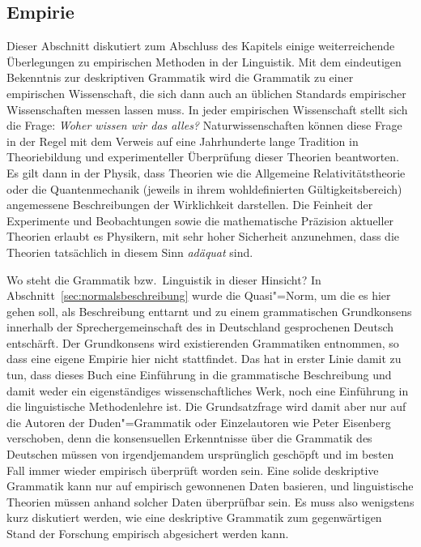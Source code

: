 \subsection{Empirie}
\label{sec:empirie}


Dieser Abschnitt diskutiert zum Abschluss des Kapitels einige weiterreichende Überlegungen zu empirischen Methoden in der Linguistik.
Mit dem eindeutigen Bekenntnis zur deskriptiven Grammatik wird die Grammatik zu einer empirischen Wissenschaft, die sich dann auch an üblichen Standards empirischer Wissenschaften messen lassen muss.
In jeder empirischen Wissenschaft stellt sich die Frage:
\textit{Woher wissen wir das alles?}
Naturwissenschaften können diese Frage in der Regel mit dem Verweis auf eine Jahrhunderte lange Tradition in Theoriebildung und experimenteller Überprüfung dieser Theorien beantworten.
Es gilt dann \zB in der Physik, dass Theorien wie die Allgemeine Relativitätstheorie oder die Quantenmechanik (jeweils in ihrem wohldefinierten Gültigkeitsbereich) angemessene Beschreibungen der Wirklichkeit darstellen.
Die Feinheit der Experimente und Beobachtungen sowie die mathematische Präzision aktueller Theorien erlaubt es Physikern, mit sehr hoher Sicherheit anzunehmen, dass die Theorien tatsächlich in diesem Sinn \textit{adäquat} sind.

Wo steht die Grammatik bzw.\ Linguistik in dieser Hinsicht?
In Abschnitt~\ref{sec:normalsbeschreibung} wurde die Quasi"=Norm, um die es hier gehen soll, als Beschreibung enttarnt und zu einem grammatischen Grundkonsens innerhalb der Sprechergemeinschaft des in Deutschland gesprochenen Deutsch entschärft.
Der Grundkonsens wird existierenden Grammatiken entnommen, so dass eine eigene Empirie hier nicht stattfindet.
Das hat in erster Linie damit zu tun, dass dieses Buch eine Einführung in die grammatische Beschreibung und damit weder ein eigenständiges wissenschaftliches Werk, noch eine Einführung in die linguistische Methodenlehre ist.
Die Grundsatzfrage wird damit aber nur auf die Autoren der Duden"=Grammatik oder Einzelautoren wie Peter Eisenberg verschoben, denn die konsensuellen Erkenntnisse über die Grammatik des Deutschen müssen von irgendjemandem ursprünglich geschöpft und im besten Fall immer wieder empirisch überprüft worden sein.
Eine solide deskriptive Grammatik kann nur auf empirisch gewonnenen Daten basieren, und linguistische Theorien müssen anhand solcher Daten überprüfbar sein.
Es muss also wenigstens kurz diskutiert werden, wie eine deskriptive Grammatik zum gegenwärtigen Stand der Forschung empirisch abgesichert werden kann.

